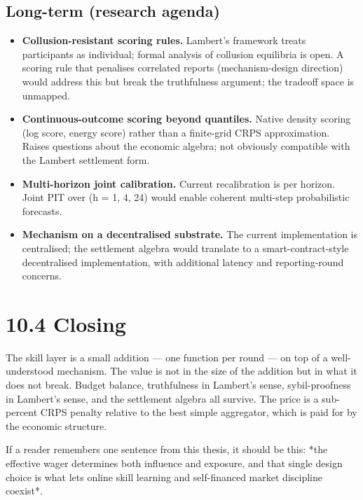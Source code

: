 \documentclass[11pt,a4paper,openany]{report}
\begin{document}
\subsection{Long-term (research agenda)}

\begin{itemize}
  \item \textbf{Collusion-resistant scoring rules.} Lambert's framework treats
    participants as individual; formal analysis of collusion equilibria
    is open. A scoring rule that penalises correlated reports
    (mechanism-design direction) would address this but break the
    truthfulness argument; the tradeoff space is unmapped.
  \item \textbf{Continuous-outcome scoring beyond quantiles.} Native density
    scoring (log score, energy score) rather than a finite-grid CRPS
    approximation. Raises questions about the economic algebra; not
    obviously compatible with the Lambert settlement form.
  \item \textbf{Multi-horizon joint calibration.} Current recalibration is per
    horizon. Joint PIT over (h = 1, 4, 24) would enable coherent
    multi-step probabilistic forecasts.
  \item \textbf{Mechanism on a decentralised substrate.} The current
    implementation is centralised; the settlement algebra would
    translate to a smart-contract-style decentralised implementation,
    with additional latency and reporting-round concerns.
\end{itemize}

\section{10.4 Closing}

The skill layer is a small addition — one function per round — on top
of a well-understood mechanism. The value is not in the size of the
addition but in what it does not break. Budget balance, truthfulness
in Lambert's sense, sybil-proofness in Lambert's sense, and the
settlement algebra all survive. The price is a sub-percent CRPS
penalty relative to the best simple aggregator, which is paid for by
the economic structure.

If a reader remembers one sentence from this thesis, it should be
this: *the effective wager determines both influence and exposure,
and that single design choice is what lets online skill learning and
self-financed market discipline coexist*.
\end{document}
